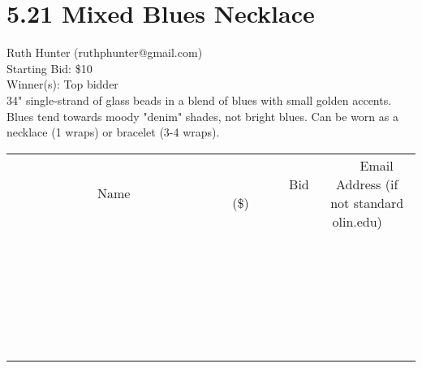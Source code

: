 \documentclass[11pt]{article}
\begin{document}
\section*{5.21 Mixed Blues Necklace}
Ruth Hunter (ruthphunter@gmail.com) \\
Starting Bid: \$10 \\
Winner(s): 
Top bidder \\
34" single-strand of glass beads in a blend of blues with small golden accents. Blues tend towards moody "denim" shades, not bright blues.  Can be worn as a necklace (1 wraps) or bracelet (3-4 wraps). \\[6ex]
\begin{tabular}{c c c}
~~~~~~~~~~~~~Name~~~~~~~~~~~~~ & ~~~~~~~~~Bid (\$)~~~~~~~~~ & ~~~Email Address (if not standard olin.edu)~~~ \\
 & & \\
\hline
 & & \\
\hline
 & & \\
\hline
 & & \\
\hline
 & & \\
\hline
 & & \\
\hline
 & & \\
\hline
 & & \\
\hline
 & & \\
\hline
 & & \\
\hline
 & & \\
\hline
 & & \\
\hline
 & & \\
\hline
 & & \\
\hline
 & & \\
\hline
 & & \\
\hline
 & & \\
\hline
 & & \\
\hline
 & & \\
\hline
 & & \\
\hline
 & & \\
\hline
 & & \\
\hline
 & & \\
\hline
 & & \\
\hline
 & & \\
\hline
 & & \\
\hline
\end{tabular}
\clearpage
\end{document}
